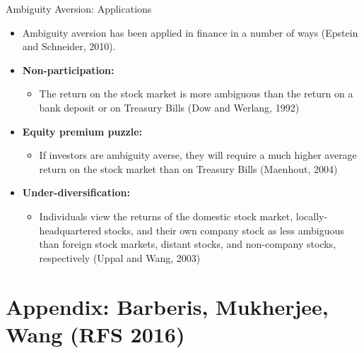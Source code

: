 \documentclass[aspectratio=169, 11pt]{beamer}
\begin{document}
\begin{frame}[shrink=5]{Ambiguity Aversion: Applications}
\begin{itemize}
\item Ambiguity aversion has been applied in finance in a number of ways (Epstein and Schneider, 2010).
\item \textbf{Non-participation:}
  \begin{itemize}
  \item The return on the stock market is more ambiguous than the return on a bank deposit or on Treasury Bills (Dow and Werlang, 1992)
  \end{itemize}
\item \textbf{Equity premium puzzle:}
  \begin{itemize}
  \item If investors are ambiguity averse, they will require a much higher average return on the stock market than on Treasury Bills (Maenhout, 2004)
  \end{itemize}
\item \textbf{Under-diversification:}
  \begin{itemize}
  \item Individuals view the returns of the domestic stock market, locally-headquartered stocks, and their own company stock as less ambiguous than foreign stock markets, distant stocks, and non-company stocks, respectively (Uppal and Wang, 2003)
  \end{itemize}
\end{itemize}
\end{frame}

\appendix
\section*{Appendix: Barberis, Mukherjee, Wang (RFS 2016)}
\end{document}
